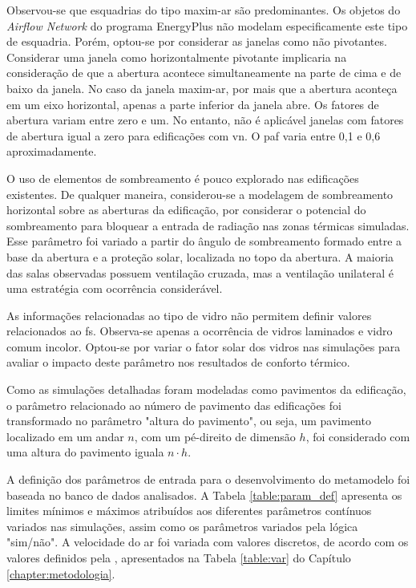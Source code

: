 \documentclass[brazil,hardcopy,openany]{ufscthesis} %
\begin{document}
Observou-se que esquadrias do tipo maxim-ar são predominantes. Os objetos do \textit{Airflow Network} do programa EnergyPlus não modelam especificamente este tipo de esquadria. Porém, optou-se por considerar as janelas como não pivotantes. Considerar uma janela como horizontalmente pivotante implicaria na consideração de que a abertura acontece simultaneamente na parte de cima e de baixo da janela. No caso da janela maxim-ar, por mais que a abertura aconteça em um eixo horizontal, apenas a parte inferior da janela abre. 
Os fatores de abertura variam entre zero e um. No entanto, não é aplicável janelas com fatores de abertura igual a zero para edificações com \acrshort{vn}.
O \acrfull{paf} varia entre 0,1 e 0,6 aproximadamente.

O uso de elementos de sombreamento é pouco explorado nas edificações existentes. De qualquer maneira, considerou-se a modelagem de sombreamento horizontal sobre as aberturas da edificação, por considerar o potencial do sombreamento para bloquear a entrada de radiação nas zonas térmicas simuladas. Esse parâmetro foi variado a partir do ângulo de sombreamento formado entre a base da abertura e a proteção solar, localizada no topo da abertura.	
A maioria das salas observadas possuem ventilação cruzada, mas a ventilação unilateral é uma estratégia com ocorrência considerável.

As informações relacionadas ao tipo de vidro não permitem definir valores relacionados ao \acrfull{fs}. Observa-se apenas a ocorrência de vidros laminados e vidro comum incolor. Optou-se por variar o fator solar dos vidros nas simulações para avaliar o impacto deste parâmetro nos resultados de conforto térmico.

Como as simulações detalhadas foram modeladas como pavimentos da edificação, o parâmetro relacionado ao número de pavimento das edificações foi transformado no parâmetro "altura do pavimento", ou seja, um pavimento localizado em um andar $n$, com um pé-direito de dimensão $h$, foi considerado com uma altura do pavimento iguala $n{\cdot}h$.

A definição dos parâmetros de entrada para o desenvolvimento do metamodelo foi baseada no banco de dados analisados. A Tabela \ref{table:param_def} apresenta os limites mínimos e máximos atribuídos aos diferentes parâmetros contínuos variados nas simulações, assim como os parâmetros variados pela lógica "sim/não". A velocidade do ar foi variada com valores discretos, de acordo com os valores definidos pela , apresentados na Tabela \ref{table:var} do Capítulo \ref{chapter:metodologia}.
\end{document}
